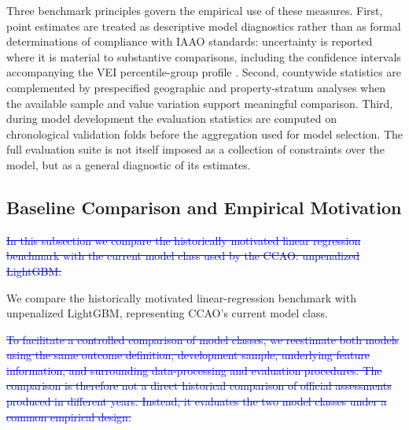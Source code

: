 \documentclass[10pt]{article}
\theoremstyle{definition}
\newcommand{\1}{\mathbf{1}}
\begin{document}
{Three benchmark principles govern the empirical use of these measures. First, point estimates are treated as descriptive model diagnostics rather than as formal determinations of compliance with IAAO standards: uncertainty is reported where it is material to substantive comparisons, including the confidence intervals accompanying the VEI percentile-group profile \cite{IAAO2013Ratio,IAAO2026ExposureRatio}. Second, countywide statistics are complemented by prespecified geographic and property-stratum analyses when the available sample and value variation support meaningful comparison. Third, during model development the evaluation statistics are computed on chronological validation folds before the aggregation used for model selection. The full evaluation suite is not itself imposed as a collection of constraints over the model, but as a general diagnostic of its estimates.





\subsection{Baseline Comparison and Empirical Motivation}
\label{subsec:baseline_tension}


\textcolor{blue}{\sout{In this subsection we compare the historically motivated linear regression benchmark with the current model class used by the CCAO: unpenalized LightGBM.}}

\textcolor{impGreen}{
We compare the historically motivated linear-regression benchmark with
unpenalized LightGBM, representing CCAO's current model class.
}

\textcolor{blue}{\sout{To facilitate a controlled comparison of model classes, we reestimate both models using the same outcome definition, development sample, underlying feature information, and surrounding data-processing and evaluation procedures. The comparison is therefore not a direct historical comparison of official assessments produced in different years. Instead, it evaluates the two model classes under a common empirical design.}}

}
\end{document}
